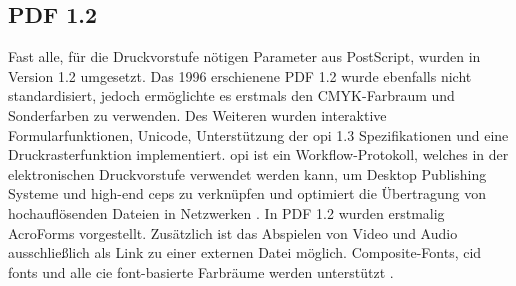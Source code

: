 \subsection{PDF 1.2}
Fast alle, für die Druckvorstufe nötigen Parameter aus PostScript, wurden in Version 1.2 umgesetzt. Das 1996 erschienene PDF 1.2 wurde ebenfalls nicht standardisiert, jedoch ermöglichte es erstmals den CMYK-Farbraum und Sonderfarben zu verwenden. Des Weiteren wurden interaktive Formularfunktionen, Unicode, Unterstützung der \gls{opi} 1.3 Spezifikationen und eine Druckrasterfunktion implementiert\cite{proj-consult}. \gls{opi} ist ein Workflow-Protokoll, welches in der elektronischen Druckvorstufe verwendet werden kann, um Desktop Publishing Systeme und high-end \gls{ceps} zu verknüpfen und optimiert die Übertragung von hochauflösenden Dateien in Netzwerken \cite{printwiki}. In PDF 1.2 wurden erstmalig AcroForms vorgestellt. Zusätzlich ist das Abspielen von Video und Audio ausschließlich als Link zu einer externen Datei möglich. Composite-Fonts, \gls{cid} fonts und alle \gls{cie} font-basierte Farbräume werden unterstützt \cite{schneeberger}.

